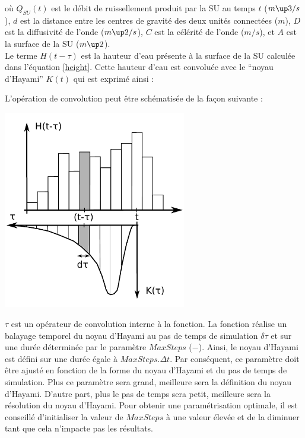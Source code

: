 

où $Q_{SU}(t)$ est le débit de ruissellement produit par la SU au temps $t$ ($m\up3/s$), $d$ est la distance entre les centres de gravité des deux unités connectées ($m$), $D$ est la diffusivité de l'onde ($m\up2/s$), $C$ est la célérité de l'onde ($m/s$), et $A$ est la surface de la SU ($m\up2$).\\

Le terme $H(t-\tau)$ est la hauteur d'eau présente à la surface de la SU calculée dans l'équation \ref{height}. Cette hauteur d'eau est convoluée avec le ``noyau d'Hayami'' $K(t)$ qui est exprimé ainsi :



L'opération de convolution peut être schématisée de la façon suivante :

\includegraphics[width=8cm]{common/Convolution_HayamiSU.pdf}

$\tau$ est un opérateur de convolution interne à la fonction. La fonction réalise un balayage temporel du noyau d'Hayami au pas de temps de simulation $\delta \tau$ et sur une durée déterminée par le paramètre $MaxSteps$ ($-$). Ainsi, le noyau d'Hayami est défini sur une durée égale à $MaxSteps.\Delta t$. Par conséquent, ce paramètre doit être ajusté en fonction de la forme du noyau d'Hayami et du pas de temps de simulation. Plus ce paramètre sera grand, meilleure sera la définition du noyau d'Hayami. D'autre part, plus le pas de temps sera petit, meilleure sera la résolution du noyau d'Hayami. Pour obtenir une paramétrisation optimale, il est conseillé d'initialiser la valeur de $MaxSteps$ à une valeur élevée et de la diminuer tant que cela n'impacte pas les résultats.\\

